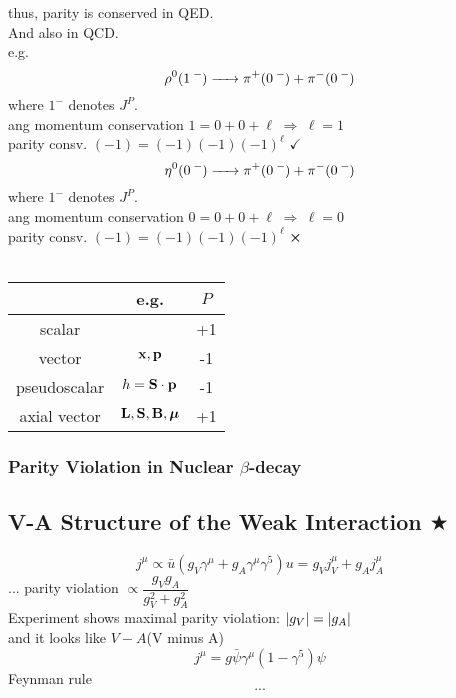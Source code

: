 \documentclass[a4paper]{article}
\DeclareMathOperator{\dra}{\;\Rightarrow\;}
\numberwithin{equation}{section}
\begin{document}
thus, parity is conserved in QED.\\
And also in QCD.\\
e.g.
\begin{equation}\label{key}
\ce{\rho^0(1^-) -> \pi^+(0^-) + \pi^-(0^-)}
\end{equation}
where $ 1^- $ denotes $ J^P $.\\
ang momentum conservation $ 1 = 0 + 0 + \ell \dra \ell = 1$\\
parity consv. $ (-1) = (-1)(-1)(-1)^\ell $  $ \checkmark $
\begin{equation}\label{key}
\ce{\eta^0(0^-) -> \pi^+(0^-) + \pi^-(0^-)}
\end{equation}
where $ 1^- $ denotes $ J^P $.\\
ang momentum conservation $ 0 = 0 + 0 + \ell \dra \ell = 0$\\
parity consv. $ (-1) = (-1)(-1)(-1)^\ell $  $ \cross $\\
~\\
\begin{table}[H]
	\begin{tabular}{|c|c|c|}
		\hline
		       & e.g. & $ P $ \\ \hline
		scalar &  &  +1 \\ \hline
		vector & $ \vb{x}, \vb{p} $ & -1 \\ \hline
		pseudoscalar & $  h = \vb{S}\cdot\vb{p} $ & -1 \\ \hline
		axial vector & $ \vb{L}, \vb{S}, \vb{B}, \bm\mu $ & +1 \\ \hline
	\end{tabular}
\end{table}

\subsubsection{Parity Violation in Nuclear $ \beta $-decay}

\subsection{V-A Structure of the Weak Interaction $ \bigstar $}
\begin{equation}\label{key}
j^\mu \propto \bar{u}(g_V\gamma^\mu + g_A\gamma^\mu \gamma^5)u = g_V j_V^\mu + g_A j_A^\mu
\end{equation}
...
parity violation $ \propto \dfrac{g_V g_A}{g_V^2 + g_A^2} $\\
Experiment shows maximal parity violation: $ \abs{g_V} = \abs{g_A} $\\
and it looks like $ V - A $(V minus A)
\begin{equation}\label{key}
j^\mu = g\bar\psi\gamma^\mu(1 - \gamma^5)\psi
\end{equation}
Feynman rule
\begin{equation}\label{key}
...
\end{equation}
\end{document}
